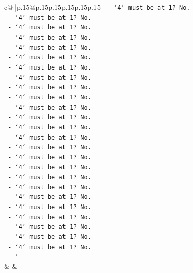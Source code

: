 \documentclass{article}
\begin{document}
{\begin{supertabular}{c@{$\;$}|p{.15\linewidth}@{}p{.15\linewidth}p{.15\linewidth}p{.15\linewidth}p{.15\linewidth}p{.15\linewidth}}
{{{\texttt{            {-} `4` must be at 1? No.} \\
\texttt{            {-} `4` must be at 1? No.} \\
\texttt{            {-} `4` must be at 1? No.} \\
\texttt{            {-} `4` must be at 1? No.} \\
\texttt{            {-} `4` must be at 1? No.} \\
\texttt{            {-} `4` must be at 1? No.} \\
\texttt{            {-} `4` must be at 1? No.} \\
\texttt{            {-} `4` must be at 1? No.} \\
\texttt{            {-} `4` must be at 1? No.} \\
\texttt{            {-} `4` must be at 1? No.} \\
\texttt{            {-} `4` must be at 1? No.} \\
\texttt{            {-} `4` must be at 1? No.} \\
\texttt{            {-} `4` must be at 1? No.} \\
\texttt{            {-} `4` must be at 1? No.} \\
\texttt{            {-} `4` must be at 1? No.} \\
\texttt{            {-} `4` must be at 1? No.} \\
\texttt{            {-} `4` must be at 1? No.} \\
\texttt{            {-} `4` must be at 1? No.} \\
\texttt{            {-} `4` must be at 1? No.} \\
\texttt{            {-} `4` must be at 1? No.} \\
\texttt{            {-} `4` must be at 1? No.} \\
\texttt{            {-} `4` must be at 1? No.} \\
\texttt{            {-} `4` must be at 1? No.} \\
\texttt{            {-} `4` must be at 1? No.} \\
\texttt{            {-} `4` must be at 1? No.} \\
\texttt{            {-} `} \\
            }
        }
    }
    & & \\ \\


\end{supertabular}}
\end{document}
